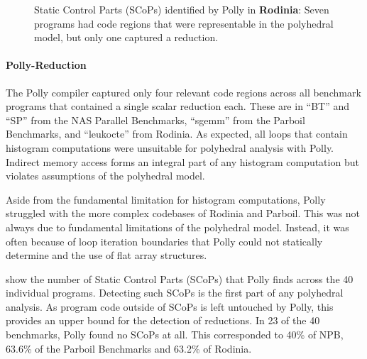 \begin{figure}[p]
    \caption{Static Control Parts (SCoPs) identified by Polly in {\bf Rodinia}:
             Seven programs had code regions that were representable in
             the polyhedral model, but only one captured a reduction.}
    \label{rodinia_scops}
\end{figure}

    \paragraph*{Polly-Reduction}
    The Polly compiler captured only four relevant code regions across all
    benchmark programs that contained a single scalar reduction each.
    These are in ``BT'' and ``SP'' from the NAS Parallel Benchmarks,
    ``sgemm'' from the Parboil Benchmarks, and ``leukocte'' from Rodinia.
    As expected, all loops that contain histogram computations were unsuitable
    for polyhedral analysis with Polly.
    Indirect memory access forms an integral part of any histogram computation
    but violates assumptions of the polyhedral model.

    Aside from the fundamental limitation for histogram computations, Polly
    struggled with the more complex codebases of Rodinia and Parboil.
    This was not always due to fundamental limitations of the polyhedral model.
    Instead, it was often because of loop iteration boundaries that Polly
    could not statically determine and the use of flat array structures.

     show the number of Static
    Control Parts (SCoPs) that Polly finds across the 40 individual programs.
    Detecting such SCoPs is the first part of any polyhedral analysis.
    As program code outside of SCoPs is left untouched by Polly, this provides
    an upper bound for the detection of reductions.
    In 23 of the 40 benchmarks, Polly found no SCoPs at all.
    This corresponded to 40\% of NPB, 63.6\% of the Parboil Benchmarks and
    63.2\% of Rodinia.

